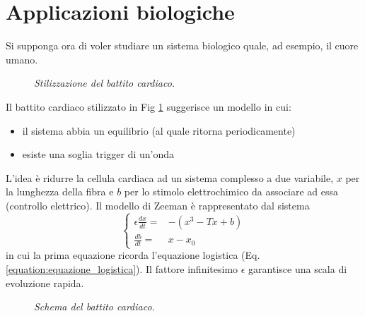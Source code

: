 \documentclass[12pt, a4paper]{book}
\theoremstyle{theorem}
\begin{document}
		\section{Applicazioni biologiche}
			Si supponga ora di voler studiare un sistema biologico quale, ad esempio, il cuore umano.
			\begin{figure}[H]
				\centering
				\caption{\emph{Stilizzazione del battito cardiaco.}}
				\label{figure:battito_cardiaco}
			\end{figure}
			Il battito cardiaco stilizzato in Fig \ref*{figure:battito_cardiaco} suggerisce un modello in cui:
			\begin{itemize}
				\item il sistema abbia un equilibrio (al quale ritorna periodicamente)
				\item esiste una soglia trigger di un'onda 
			\end{itemize}
			L'idea è ridurre la cellula cardiaca ad un sistema complesso a due variabile, $x$ per la lunghezza della fibra e $b$ per lo stimolo elettrochimico da associare ad essa (controllo elettrico).
			Il modello di Zeeman è rappresentato dal sistema
			\begin{equation}
				\begin{cases}
					\epsilon\frac{dx}{dt}=&-\left(x^3-Tx+b\right)\\
					\frac{db}{dt}=&x-x_{0}
				\end{cases}
			\end{equation}
			in cui la prima equazione ricorda l'equazione logistica (Eq. \ref*{equation:equazione_logistica}).
			Il fattore infinitesimo $\epsilon$ garantisce una scala di evoluzione rapida.
			\begin{figure}[H]
				\centering
				\caption{\emph{Schema del battito cardiaco.}}
				\label{figure:schema_battito_cardiaco}
			\end{figure}
\end{document}
